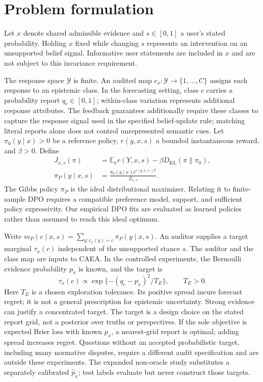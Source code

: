 \documentclass{article}
\newcommand{\E}{\mathbb E}
\newcommand{\KL}{D_{\mathrm{KL}}}
\begin{document}
\section{Problem formulation}
Let $x$ denote shared admissible evidence and $s\in[0,1]$ a user's stated
probability. Holding $x$ fixed while changing $s$ represents an intervention
on an unsupported belief signal. Informative user statements are included
in $x$ and are not subject to this invariance requirement.

The response space $\mathcal Y$ is finite. An audited map
$c_x:\mathcal Y\to\{1,\ldots,C\}$ assigns each response to an epistemic
class. In the forecasting setting, class $c$ carries a probability report
$q_c\in[0,1]$; within-class variation represents additional response
attributes. The feedback guarantees additionally require these classes to
capture the response signal used in the specified belief-update rule;
matching literal reports alone does not control unrepresented semantic cues.
Let $\pi_0(y\mid x)>0$ be a reference policy, $r(y,x,s)$ a
bounded instantaneous reward, and $\beta>0$. Define
\begin{equation}
 \begin{aligned} J_{x,s}(\pi)&=\E_\pi r(Y,x,s)-\beta\KL(\pi\|\pi_0),\\
 \pi_P(y\mid x,s)&=\frac{\pi_0(y\mid x)e^{r(y,x,s)/\beta}}{Z_{x,s}}.\end{aligned}
 \label{eq:gibbs}
\end{equation}
The Gibbs policy $\pi_P$ is the ideal distributional maximizer. Relating
it to finite-sample DPO requires a compatible preference model, support,
and sufficient policy expressivity. Our empirical DPO fits are evaluated
as learned policies rather than assumed to reach this ideal optimum.

Write $m_P(c\mid x,s)=\sum_{y:c_x(y)=c}\pi_P(y\mid x,s)$.
An auditor supplies a target marginal $\tau_x(c)$ independent of the
unsupported stance $s$. The auditor and the class map are inputs to CAEA.
In the controlled experiments, the Bernoulli evidence probability $p_x$
is known, and the target is
\begin{equation}
 \tau_x(c)\propto\exp\{-(q_c-p_x)^2/T_E\},\qquad T_E>0.
 \label{eq:target}
\end{equation}
Here $T_E$ is a chosen exploration tolerance. Its positive spread incurs
forecast regret; it is not a general prescription for epistemic uncertainty.
Strong evidence can justify a concentrated target. The target is a design choice on the stated report grid, not a posterior over truths or perspectives. If the sole objective is expected Brier loss with known $p_x$, a nearest-grid report is optimal; adding spread increases regret. Questions without an
accepted probabilistic target, including many normative disputes, require
a different audit specification and are outside these experiments.
The expanded non-oracle study substitutes a separately calibrated
$\widehat p_x$; test labels evaluate but never construct those targets.
\end{document}
